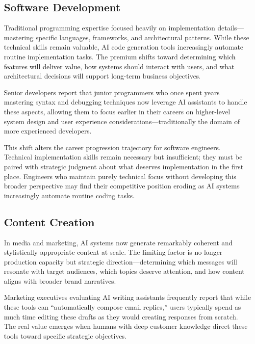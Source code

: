 \documentclass[
  Letterpaper,
]{scrbook}
\begin{document}
\subsection{Software Development}\label{software-development}

Traditional programming expertise focused heavily on implementation
details---mastering specific languages, frameworks, and architectural
patterns. While these technical skills remain valuable, AI code
generation tools increasingly automate routine implementation tasks. The
premium shifts toward determining which features will deliver value, how
systems should interact with users, and what architectural decisions
will support long-term business objectives.

Senior developers report that junior programmers who once spent years
mastering syntax and debugging techniques now leverage AI assistants to
handle these aspects, allowing them to focus earlier in their careers on
higher-level system design and user experience
considerations---traditionally the domain of more experienced
developers.

This shift alters the career progression trajectory for software
engineers. Technical implementation skills remain necessary but
insufficient; they must be paired with strategic judgment about what
deserves implementation in the first place. Engineers who maintain
purely technical focus without developing this broader perspective may
find their competitive position eroding as AI systems increasingly
automate routine coding tasks.

\subsection{Content Creation}\label{content-creation}

In media and marketing, AI systems now generate remarkably coherent and
stylistically appropriate content at scale. The limiting factor is no
longer production capacity but strategic direction---determining which
messages will resonate with target audiences, which topics deserve
attention, and how content aligns with broader brand narratives.

Marketing executives evaluating AI writing assistants frequently report
that while these tools can ``automatically compose email replies,''
users typically spend as much time editing these drafts as they would
creating responses from scratch. The real value emerges when humans with
deep customer knowledge direct these tools toward specific strategic
objectives.
\end{document}
